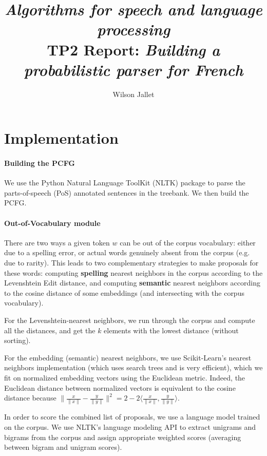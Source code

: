 \documentclass[11pt]{article}
\title{\textit{Algorithms for speech and language processing}\\
{\sffamily TP2 Report: \textit{Building a probabilistic parser for French}}}
\author{Wilson Jallet}
\begin{document}
\maketitle

\section{Implementation}

\paragraph{Building the PCFG}

We use the Python Natural Language ToolKit (NLTK) \cite{nltkCitation} package to parse the parts-of-speech (PoS) annotated sentences in the treebank. We then build the PCFG.


\paragraph{Out-of-Vocabulary module}

There are two ways a given token $w$ can be out of the corpus vocabulary: either due to a spelling error, or actual words genuinely absent from the corpus (e.g. due to rarity).
This leads to two complementary strategies to make proposals for these words: computing \textbf{spelling} nearest neighbors in the corpus according to the Levenshtein Edit distance, and computing \textbf{semantic} nearest neighbors according to the cosine distance of some embeddings (and intersecting with the corpus vocabulary).

For the Levenshtein-nearest neighbors, we run through the corpus and compute all the distances, and get the $k$ elements with the lowest distance (without sorting).

For the embedding (semantic) nearest neighbors, we use Scikit-Learn's nearest neighbors implementation \cite{scikit-learn} (which uses search trees and is very efficient), which we fit on normalized embedding vectors using the Euclidean metric. Indeed, the Euclidean distance between normalized vectors is equivalent to the cosine distance because $\|\frac{x}{\|x\|} - \frac{y}{\|y\|}\|^2 = 2 - 2\langle \frac{x}{\|x\|}, \frac{y}{\|y\|}\rangle$.

In order to score the combined list of proposals, we use a language model trained on the corpus. We use NLTK's language modeling API to extract unigrams and bigrams from the corpus and assign appropriate weighted scores (averaging between bigram and unigram scores).

\printbibliography{}
\end{document}
